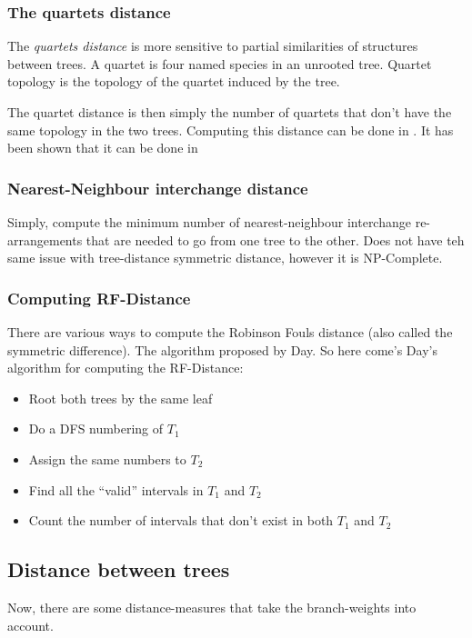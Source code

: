     \subsubsection{The quartets distance}
    The \textit{quartets distance} is more sensitive to partial similarities of 
    structures between trees. A quartet is four named species in an unrooted 
    tree. Quartet topology is the topology of the quartet induced by the tree. 
    
    The quartet distance is then simply the number of quartets that don't have 
    the same topology in the two trees. Computing this distance can be done in 
    . It has been shown that it can be done in 
    
    \subsubsection{Nearest-Neighbour interchange distance}
    Simply, compute the minimum number of nearest-neighbour interchange 
    re-arrangements that are needed to go from one tree to the other. Does not 
    have teh same issue with tree-distance symmetric distance, however it is 
    NP-Complete.
    
    \subsubsection{Computing RF-Distance}
    There are various ways to compute the Robinson Fouls distance (also called 
    the symmetric difference). The  algorithm proposed by Day. So here 
    come's Day's algorithm for computing the RF-Distance:
    \begin{itemize}
        \item Root both trees by the same leaf
        \item Do a DFS numbering of $T_1$
        \item Assign the same numbers to $T_2$
        \item Find all the ``valid'' intervals in $T_1$ and $T_2$
        \item Count the number of intervals that don't exist in both $T_1$ and 
        $T_2$
    \end{itemize}
    
    \subsection{Distance between trees}
    Now, there are some distance-measures that take the branch-weights into 
    account.
    

